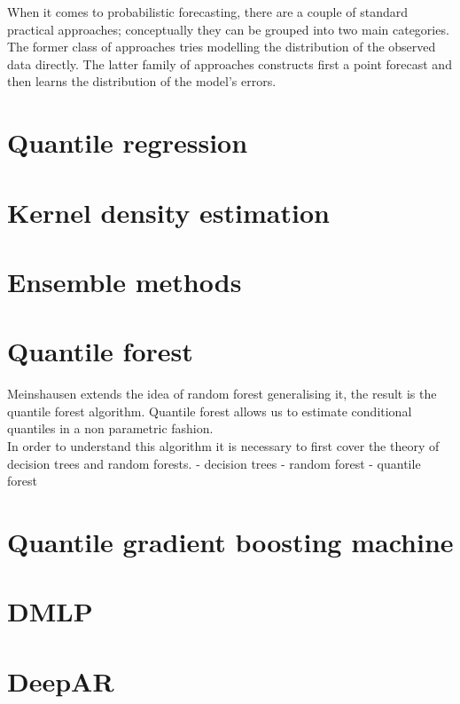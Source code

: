 When it comes to probabilistic forecasting, there are a couple of standard practical approaches; conceptually they can be grouped into two main categories. The former class of approaches tries modelling the distribution of the observed data directly. The latter family of approaches constructs first a point forecast and then learns the distribution of the model's errors.
\section{Quantile regression}


\section{Kernel density estimation}


\section{Ensemble methods}


\section{Quantile forest}
Meinshausen \cite{meinshausen2006quantile} extends the idea of random forest \cite{breiman2001random} generalising it, the result is the quantile forest algorithm. Quantile forest allows us to estimate conditional quantiles in a non parametric fashion.
\\
In order to understand this algorithm it is necessary to first cover the theory of decision trees and random forests.
- decision trees
- random forest
- quantile forest
\section{Quantile gradient boosting machine}


\section{DMLP}
\section{DeepAR}

